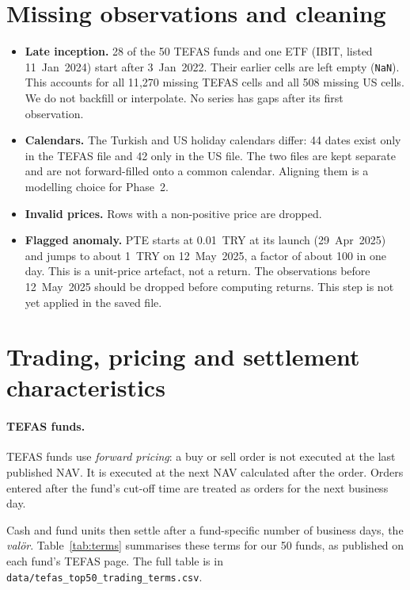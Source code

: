\documentclass[11pt,a4paper]{article}
\newcommand{\code}[1]{\texttt{\small #1}}
\begin{document}
\section{Missing observations and cleaning}
\begin{itemize}
  \item \textbf{Late inception.} 28 of the 50 TEFAS funds and one ETF (IBIT, listed
        11~Jan~2024) start after 3~Jan~2022. Their earlier cells are left empty
        (\code{NaN}). This accounts for all 11{,}270 missing TEFAS cells and all 508
        missing US cells. We do not backfill or interpolate. No series has gaps after its
        first observation.
  \item \textbf{Calendars.} The Turkish and US holiday calendars differ: 44 dates exist
        only in the TEFAS file and 42 only in the US file. The two files are kept separate
        and are not forward-filled onto a common calendar. Aligning them is a modelling
        choice for Phase~2.
  \item \textbf{Invalid prices.} Rows with a non-positive price are dropped.
  \item \textbf{Flagged anomaly.} PTE starts at 0.01~TRY at its launch (29~Apr~2025) and
        jumps to about 1~TRY on 12~May~2025, a factor of about 100 in one day. This is a
        unit-price artefact, not a return. The observations before 12~May~2025 should be
        dropped before computing returns. This step is not yet applied in the saved file.
\end{itemize}

\section{Trading, pricing and settlement characteristics}
\paragraph{TEFAS funds.}
TEFAS funds use \emph{forward pricing}: a buy or sell order is not executed at the last
published NAV. It is executed at the next NAV calculated after the order. Orders entered
after the fund's cut-off time are treated as orders for the next business day.

Cash and fund units then settle after a fund-specific number of business days, the
\emph{valör}. Table~\ref{tab:terms} summarises these terms for our 50 funds, as published
on each fund's TEFAS page. The full table is in
\code{data/tefas\_top50\_trading\_terms.csv}.
\end{document}
